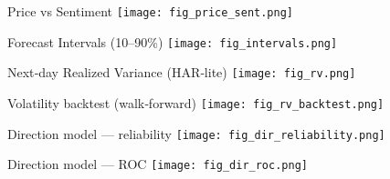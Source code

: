 \documentclass[11pt]{beamer}
\begin{document}
\begin{frame}{Price vs Sentiment}
  \centering
  \texttt{[image: fig\_price\_sent.png]}
\end{frame}

\begin{frame}{Forecast Intervals (10--90\%)}
  \centering
  \texttt{[image: fig\_intervals.png]}
\end{frame}

\begin{frame}{Next‑day Realized Variance (HAR‑lite)}
  \centering
  \texttt{[image: fig\_rv.png]}
\end{frame}

\begin{frame}{Volatility backtest (walk‑forward)}
  \centering
  \texttt{[image: fig\_rv\_backtest.png]}
\end{frame}

\begin{frame}{Direction model — reliability}
  \centering
  \texttt{[image: fig\_dir\_reliability.png]}
\end{frame}

\begin{frame}{Direction model — ROC}
  \centering
  \texttt{[image: fig\_dir\_roc.png]}
\end{frame}
\end{document}
